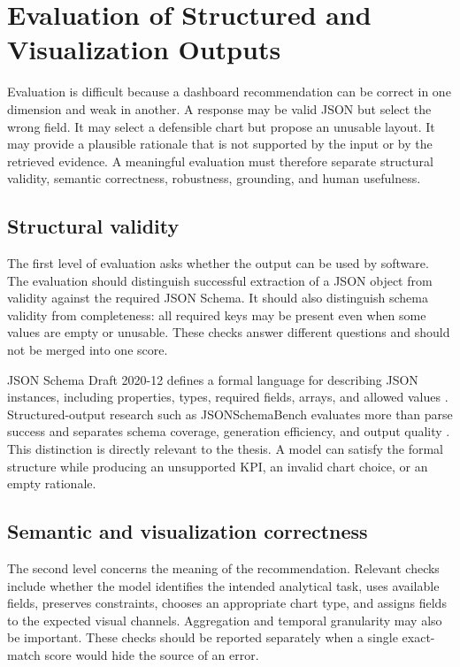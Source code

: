 \section{Evaluation of Structured and Visualization Outputs}

Evaluation is difficult because a dashboard recommendation can be correct in one dimension and weak in another. A response may be valid JSON but select the wrong field. It may select a defensible chart but propose an unusable layout. It may provide a plausible rationale that is not supported by the input or by the retrieved evidence. A meaningful evaluation must therefore separate structural validity, semantic correctness, robustness, grounding, and human usefulness.

\subsection{Structural validity}

The first level of evaluation asks whether the output can be used by software. The evaluation should distinguish successful extraction of a JSON object from validity against the required JSON Schema. It should also distinguish schema validity from completeness: all required keys may be present even when some values are empty or unusable. These checks answer different questions and should not be merged into one score.

JSON Schema Draft 2020-12 defines a formal language for describing JSON instances, including properties, types, required fields, arrays, and allowed values \cite{jsonschema2022draft}. Structured-output research such as JSONSchemaBench evaluates more than parse success and separates schema coverage, generation efficiency, and output quality \cite{geng2025structured}. This distinction is directly relevant to the thesis. A model can satisfy the formal structure while producing an unsupported KPI, an invalid chart choice, or an empty rationale.

\subsection{Semantic and visualization correctness}

The second level concerns the meaning of the recommendation. Relevant checks include whether the model identifies the intended analytical task, uses available fields, preserves constraints, chooses an appropriate chart type, and assigns fields to the expected visual channels. Aggregation and temporal granularity may also be important. These checks should be reported separately when a single exact-match score would hide the source of an error.


